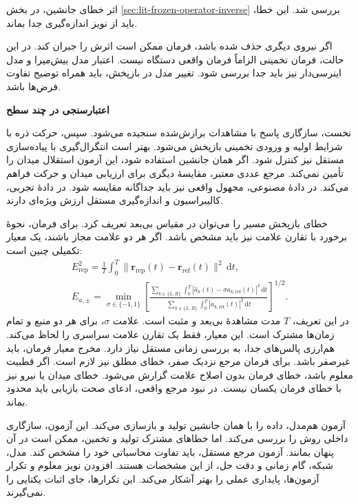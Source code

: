 اثر خطای جانشین، در بخش \ref{sec:lit-frozen-operator-inverse} بررسی شد.
این خطا، باید از نویز اندازه‌گیری جدا بماند.
\cite{Cao2023ResidualCorrection}

اگر نیروی دیگری حذف شده باشد، فرمان ممکن است اثرش را جبران کند.
در این حالت، فرمان تخمینی الزاماً فرمان واقعی دستگاه نیست.
اعتبار مدل بیش‌میرا و مدل اینرسی‌دار نیز باید جدا بررسی شود.
تغییر مدل در بازپخش، باید همراه توضیح تفاوت فرض‌ها باشد.

\textbf{اعتبارسنجی در چند سطح}

نخست، سازگاری پاسخ با مشاهدات برازش‌شده سنجیده می‌شود.
سپس، حرکت ذره با شرایط اولیه و ورودی تخمینی بازپخش می‌شود.
بهتر است انتگرال‌گیری با پیاده‌سازی مستقل نیز کنترل شود.
اگر همان جانشین استفاده شود، این آزمون استقلال میدان را تأمین نمی‌کند.
مرجع عددی معتبر، مقایسهٔ دیگری برای ارزیابی میدان و حرکت فراهم می‌کند.
در دادهٔ مصنوعی، مجهول واقعی نیز باید جداگانه مقایسه شود.
در دادهٔ تجربی، کالیبراسیون و اندازه‌گیری مستقل ارزش ویژه‌ای دارند.

خطای بازپخش مسیر را می‌توان در مقیاس بی‌بعد تعریف کرد.
برای فرمان، نحوهٔ برخورد با تقارن علامت نیز باید مشخص باشد.
اگر هر دو علامت مجاز باشند، یک معیار تکمیلی چنین است:
\begin{equation}
\begin{gathered}
E_{\mathrm{rep}}^2
=\frac{1}{T}\int_0^T
\|\mathbf r_{\mathrm{rep}}(t)-\mathbf r_{\mathrm{ref}}(t)\|^2\,\mathrm dt,\\
E_{a,\pm}
=\min_{\sigma\in\{-1,1\}}
\left[
\frac{\displaystyle\sum_{k\in\{L,R\}}\int_0^T
|\widehat a_k(t)-\sigma a_{k,\mathrm{ref}}(t)|^2\,\mathrm dt}
{\displaystyle\sum_{k\in\{L,R\}}\int_0^T
|a_{k,\mathrm{ref}}(t)|^2\,\mathrm dt}
\right]^{1/2}.
\end{gathered}
\label{eq:lit-magnetic-validation-errors}
\end{equation}
در این تعریف، $T$ مدت مشاهدهٔ بی‌بعد و مثبت است.
علامت $\sigma$، برای هر دو منبع و تمام زمان‌ها مشترک است.
این معیار، فقط یک تقارن علامت سراسری را لحاظ می‌کند.
هم‌ارزی پالس‌های جدا، به بررسی زمانی مستقل نیاز دارد.
مخرج معیار فرمان، باید غیرصفر باشد.
برای فرمان مرجع نزدیک صفر، خطای مطلق نیز لازم است.
اگر قطبیت معلوم باشد، خطای فرمان بدون اصلاح علامت گزارش می‌شود.
خطای میدان یا نیرو نیز با خطای فرمان یکسان نیست.
در نبود مرجع واقعی، ادعای صحت بازیابی باید محدود بماند.

آزمون هم‌مدل، داده را با همان جانشین تولید و بازسازی می‌کند.
این آزمون، سازگاری داخلی روش را بررسی می‌کند.
اما خطاهای مشترک تولید و تخمین، ممکن است در آن پنهان بمانند.
آزمون مرجع مستقل، باید تفاوت محاسباتی خود را مشخص کند.
مدل، شبکه، گام زمانی و دقت حل، از این مشخصات هستند.
افزودن نویز معلوم و تکرار آزمون‌ها، پایداری عملی را بهتر آشکار می‌کند.
این تکرارها، جای اثبات یکتایی را نمی‌گیرند.

